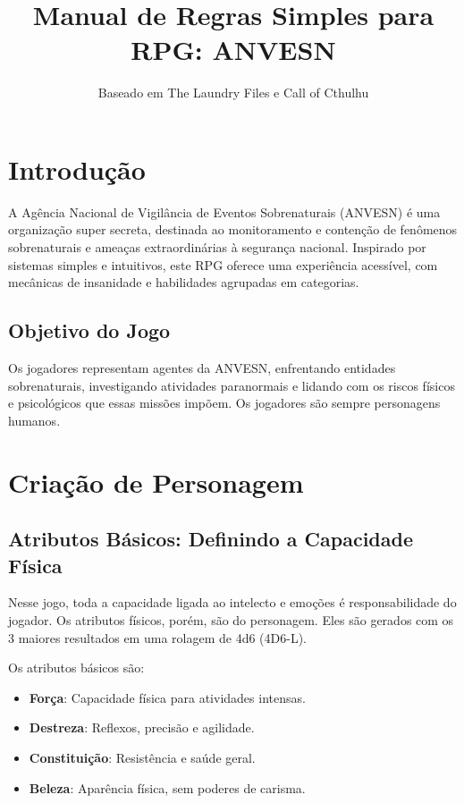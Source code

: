 \documentclass[a4paper,12pt]{book}
\title{Manual de Regras Simples para RPG: ANVESN}
\author{Baseado em The Laundry Files e Call of Cthulhu}
\date{}
\begin{document}
\maketitle

\tableofcontents

\chapter{Introdução}

A Agência Nacional de Vigilância de Eventos Sobrenaturais (ANVESN) é uma organização super secreta, destinada ao monitoramento e contenção de fenômenos sobrenaturais e ameaças extraordinárias à segurança nacional. Inspirado por sistemas simples e intuitivos, este RPG oferece uma experiência acessível, com mecânicas de insanidade e habilidades agrupadas em categorias.

\section{Objetivo do Jogo}

Os jogadores representam agentes da ANVESN, enfrentando entidades sobrenaturais, investigando atividades paranormais e lidando com os riscos físicos e psicológicos que essas missões impõem. Os jogadores são sempre personagens humanos.

\chapter{Criação de Personagem}

\section{Atributos Básicos: Definindo a Capacidade Física}

Nesse jogo, toda a capacidade ligada ao intelecto e emoções é responsabilidade do jogador. Os atributos físicos, porém, são do personagem. Eles são gerados com os 3 maiores resultados em uma rolagem de 4d6 (4D6-L). 

Os atributos básicos são:

\begin{itemize}
\item \textbf{Força}: Capacidade física para atividades intensas.
\item \textbf{Destreza}: Reflexos, precisão e agilidade.
\item \textbf{Constituição}: Resistência e saúde geral.
\item \textbf{Beleza}: Aparência física, sem poderes de carisma.
\end{itemize}
\end{document}
